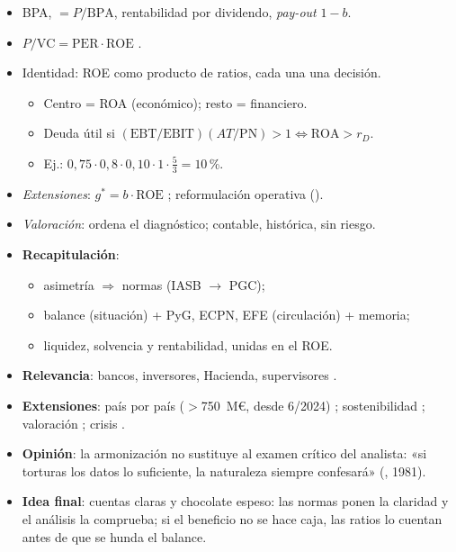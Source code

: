 \documentclass{article}
\begin{document}
\begin{columnas}
\begin{itemize}
\item BPA,  $=P/\mathrm{BPA}$, rentabilidad por dividendo, \emph{pay-out} $1-b$.
\item $P/\text{VC}=\mathrm{PER}\cdot\mathrm{ROE}$  .
\end{itemize}
\begin{itemize}
\item Identidad: ROE como producto de ratios, cada una una decisión.
  \begin{itemize}
  \item Centro = ROA (económico); resto = financiero.
  \item Deuda útil si $(\mathrm{EBT}/\mathrm{EBIT})(AT/\mathrm{PN})>1\iff\mathrm{ROA}>r_D$.
  \item Ej.: $0{,}75\cdot0{,}8\cdot0{,}10\cdot1\cdot\tfrac53=10$\,\%.
  \end{itemize}
\item \emph{Extensiones}: $g^*=b\cdot\mathrm{ROE}$ ; reformulación operativa ().
\item \emph{Valoración}: ordena el diagnóstico; contable, histórica, sin riesgo.
\end{itemize}

\begin{itemize}
\item \textbf{Recapitulación}:
  \begin{itemize}
  \item asimetría $\Rightarrow$ normas (IASB $\to$ PGC);
  \item balance (situación) + PyG, ECPN, EFE (circulación) + memoria;
  \item liquidez, solvencia y rentabilidad, unidas en el ROE.
  \end{itemize}
\item \textbf{Relevancia}: bancos, inversores, Hacienda, supervisores .
\item \textbf{Extensiones}: país por país ($>$750~M€, desde 6/2024) ; sostenibilidad ; valoración  ; crisis .
\item \textbf{Opinión}: la armonización no sustituye al examen crítico del analista: «si torturas los datos lo suficiente, la naturaleza siempre confesará» (, 1981).
\item \textbf{Idea final}: cuentas claras y chocolate espeso: las normas ponen la claridad y el análisis la comprueba; si el beneficio no se hace caja, las ratios lo cuentan antes de que se hunda el balance.
\end{itemize}


\end{columnas}
\end{document}
